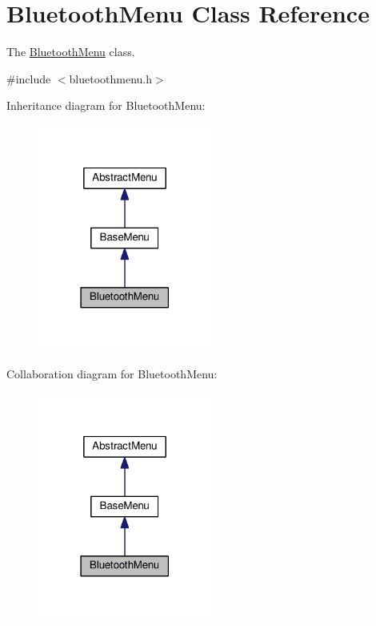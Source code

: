 \hypertarget{classBluetoothMenu}{}\section{Bluetooth\+Menu Class Reference}
\label{classBluetoothMenu}


The \hyperlink{classBluetoothMenu}{Bluetooth\+Menu} class.  




{\ttfamily \#include $<$bluetoothmenu.\+h$>$}



Inheritance diagram for Bluetooth\+Menu\+:
\nopagebreak
\begin{figure}[H]
\begin{center}
\leavevmode
\includegraphics[width=162pt]{classBluetoothMenu__inherit__graph}
\end{center}
\end{figure}


Collaboration diagram for Bluetooth\+Menu\+:
\nopagebreak
\begin{figure}[H]
\begin{center}
\leavevmode
\includegraphics[width=162pt]{classBluetoothMenu__coll__graph}
\end{center}
\end{figure}
